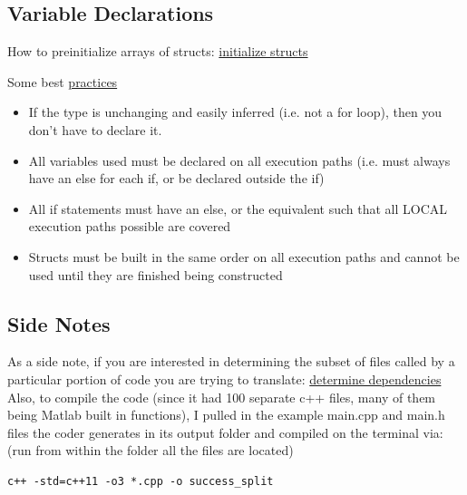 \documentclass{article}
\begin{document}
\begin{itemize}
\end{itemize}

\subsection{Variable Declarations}

How to preinitialize arrays of structs:
\href{https://www.mathworks.com/help/simulink/ug/defining-arrays-of-structures-for-code-generation.html}{initialize structs}

Some best  \href{https://www.mathworks.com/help/simulink/ug/best-practices-for-defining-variables-for-c-c-code-generation.html}{practices}

\begin{itemize}

\item If the type is unchanging and easily inferred (i.e. not a for loop), then you don't have to declare it.
\item All variables used must be declared on all execution paths (i.e. must always have an else for each if, or be declared outside the if)
\item All if statements must have an else, or the equivalent such that all LOCAL execution paths possible are covered
\item Structs must be built in the same order on all execution paths and cannot be used until they are finished being constructed

\end{itemize}

\subsection{Side Notes}

As a side note, if you are interested in determining the subset of files called by a particular portion of code you are trying to translate: \href{https://www.mathworks.com/help/matlab/matlab_prog/identify-dependencies.html}{determine dependencies}\\

Also, to compile the code (since it had 100 separate c++ files, many of them being Matlab built in functions), I pulled in the example main.cpp and main.h files the coder generates in its output folder and compiled on the terminal via: (run from within the folder all the files are located)

\begin{verbatim}
c++ -std=c++11 -o3 *.cpp -o success_split
\end{verbatim}
\end{document}
